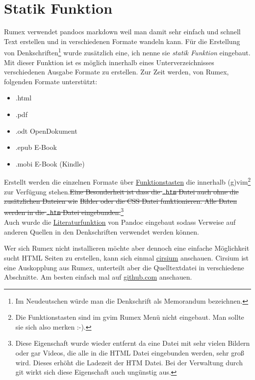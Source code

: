 \chapter{Statik Funktion}

Rumex verwendet pandocs markdown weil man damit sehr einfach und schnell
Text erstellen und in verschiedenen Formate wandeln kann. Für die
Erstellung von Denkschriften\footnote{Im Neudeutschen würde man die
  Denkschrift als Memorandum bezeichnen.} wurde zusätzlich eine, ich
nenne sie \emph{statik Funktion} eingebaut. Mit dieser Funktion ist es
möglich innerhalb eines Unterverzeichnisses verschiedenen Ausgabe
Formate zu erstellen. Zur Zeit werden, von Rumex, folgenden Formate
unterstützt:

\begin{itemize}
\itemsep1pt\parskip0pt
\item
  .html
\item
  .pdf
\item
  .odt OpenDokument
\item
  .epub E-Book
\item
  .mobi E-Book (Kindle)
\end{itemize}

Erstellt werden die einzelnen Formate über
\hyperref[rumex-kurztasten]{Funktionstasten} die innerhalb
(g)vim\footnote{Die Funktionstasten sind im gvim Rumex Menü nicht
  eingebaut. Man sollte sie sich also merken :-).} zur Verfügung
stehen.\sout{Eine Besonderheit ist dass die \texttt{.htm} Datei auch
ohne die zusätzlichen Dateien wie} \sout{Bilder oder die CSS Datei
funktionieren. Alle Daten werden in die \texttt{.htm} Datei
eingebunden.}\footnote{Diese Eigenschaft wurde wieder entfernt da eine
  Datei mit sehr vielen Bildern oder gar Videos, die alle in die HTML
  Datei eingebunden werden, sehr groß wird. Dieses erhöht die Ladezeit
  der HTM Datei. Bei der Verwaltung durch git wirkt sich diese
  Eigenschaft auch ungünstig aus.}\\Auch wurde die
\hyperref[litfunk]{Literaturfunktion} von Pandoc eingebaut sodass
Verweise auf anderen Quellen in den Denkschriften verwendet werden
können.

Wer sich Rumex nicht installieren möchte aber dennoch eine einfache
Möglichkeit sucht HTML Seiten zu erstellen, kann sich einmal
\href{http://www.it-bayer.de/cirsium}{cirsium} anschauen. Cirsium ist
eine Auskopplung aus Rumex, unterteilt aber die Quelltextdatei in
verschiedene Abschnitte. Am besten einfach mal auf
\href{http://www.github.com/itbayer/cirsium}{github.com} anschauen.

